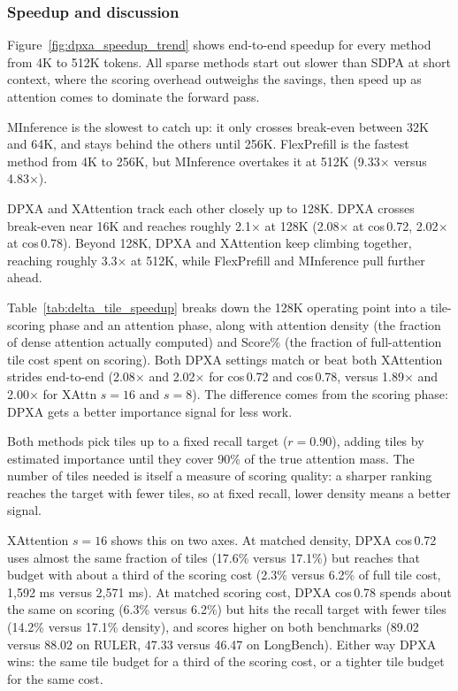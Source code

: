 \subsubsection{Speedup and discussion}

Figure~\ref{fig:dpxa_speedup_trend} shows end-to-end speedup for every method from 4K to 512K tokens. All sparse methods start out slower than SDPA at short context, where the scoring overhead outweighs the savings, then speed up as attention comes to dominate the forward pass.

MInference is the slowest to catch up: it only crosses break-even between 32K and 64K, and stays behind the others until 256K. FlexPrefill is the fastest method from 4K to 256K, but MInference overtakes it at 512K (9.33$\times$ versus 4.83$\times$).

DPXA and XAttention track each other closely up to 128K. DPXA crosses break-even near 16K and reaches roughly 2.1$\times$ at 128K (2.08$\times$ at cos\,0.72, 2.02$\times$ at cos\,0.78). Beyond 128K, DPXA and XAttention keep climbing together, reaching roughly 3.3$\times$ at 512K, while FlexPrefill and MInference pull further ahead.

Table~\ref{tab:delta_tile_speedup} breaks down the 128K operating point into a tile-scoring phase and an attention phase, along with attention density (the fraction of dense attention actually computed) and Score\% (the fraction of full-attention tile cost spent on scoring). Both DPXA settings match or beat both XAttention strides end-to-end (2.08$\times$ and 2.02$\times$ for cos\,0.72 and cos\,0.78, versus 1.89$\times$ and 2.00$\times$ for XAttn $s{=}16$ and $s{=}8$). The difference comes from the scoring phase: DPXA gets a better importance signal for less work.

Both methods pick tiles up to a fixed recall target ($r{=}0.90$), adding tiles by estimated importance until they cover 90\% of the true attention mass. The number of tiles needed is itself a measure of scoring quality: a sharper ranking reaches the target with fewer tiles, so at fixed recall, lower density means a better signal.

XAttention $s{=}16$ shows this on two axes. At matched density, DPXA cos\,0.72 uses almost the same fraction of tiles (17.6\% versus 17.1\%) but reaches that budget with about a third of the scoring cost (2.3\% versus 6.2\% of full tile cost, 1{,}592 ms versus 2{,}571 ms). At matched scoring cost, DPXA cos\,0.78 spends about the same on scoring (6.3\% versus 6.2\%) but hits the recall target with fewer tiles (14.2\% versus 17.1\% density), and scores higher on both benchmarks (89.02 versus 88.02 on RULER, 47.33 versus 46.47 on LongBench). Either way DPXA wins: the same tile budget for a third of the scoring cost, or a tighter tile budget for the same cost.

